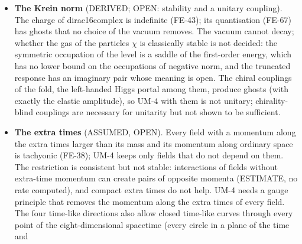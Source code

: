 \documentclass[
  10pt,
]{article}
\begin{document}
\begin{itemize}
  \(q_{\mathrm{b}} = 0.99\,m_\Psi\)). Above \(9.7\times10^4\) GeV no
  thermal relic is possible (S-20), so only particles bound more
  strongly than \(q_{\mathrm{b}} \approx 0.9\,m_\Psi\) could be a
  thermal relic; for a weaker binding their abundance needs a
  non-thermal origin. The portals of IN-16 cannot provide the binding:
  bound by the author's Higgs portal the particles would have to be
  bound so weakly (direct detection) that they live long enough only for
  \(H < 2.5\) GeV (S-22), bound by the gluon condensate they would
  scatter on nucleons 29 to 33 orders of magnitude above the limit
  (S-29), and the other mean values of the portals vanish in the vacuum;
  the current portals, whose convective current annihilates the
  particles only with the fourth power of the velocity, cannot set the
  relic density of a perturbatively coupled \(\chi\) (S-21). The dark
  matter of UM-4 needs a binding of \(\chi\) to the fold that does not
  couple it to nucleons, which the action of UM-4 does not contain.
\item
  \textbf{The Krein norm} (DERIVED; OPEN: stability and a unitary
  coupling). The charge of dirac16complex is indefinite (FE-43); its
  quantisation (FE-67) has ghosts that no choice of the vacuum removes.
  The vacuum cannot decay; whether the gas of the particles \(\chi\) is
  classically stable is not decided: the symmetric occupation of the
  level is a saddle of the first-order energy, which has no lower bound
  on the occupations of negative norm, and the truncated response has an
  imaginary pair whose meaning is open. The chiral couplings of the
  fold, the left-handed Higgs portal among them, produce ghosts (with
  exactly the elastic amplitude), so UM-4 with them is not unitary;
  chirality-blind couplings are necessary for unitarity but not shown to
  be sufficient.
\item
  \textbf{The extra times} (ASSUMED, OPEN). Every field with a momentum
  along the extra times larger than its mass and its momentum along
  ordinary space is tachyonic (FE-38); UM-4 keeps only fields that do
  not depend on them. The restriction is consistent but not stable:
  interactions of fields without extra-time momentum can create pairs of
  opposite momenta (ESTIMATE, no rate computed), and compact extra times
  do not help. UM-4 needs a gauge principle that removes the momentum
  along the extra times of every field. The four time-like directions
  also allow closed time-like curves through every point of the
  eight-dimensional spacetime (every circle in a plane of the time and

\end{itemize}
\end{document}
